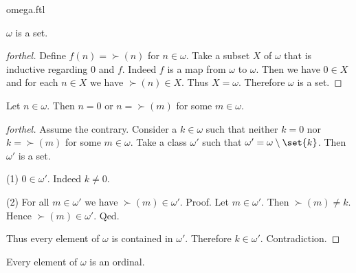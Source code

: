 \documentclass{naproche-library}
\begin{document}
\begin{smodule}[title=Natural Numbers]{omega.ftl}
\begin{corollary}[forthel,id=SET_THEORY_03_4847727433220096]
  $\omega$ is a set.
\end{corollary}
\begin{proof}[forthel]
  Define $f(n) = \succ(n)$ for $n \in \omega$.
  Take a subset $X$ of $\omega$ that is inductive regarding $0$ and $f$.
  Indeed $f$ is a map from $\omega$ to $\omega$.
  Then we have $0 \in X$ and for each $n \in X$ we have $\succ(n) \in X$.
  Thus $X = \omega$.
  Therefore $\omega$ is a set.
\end{proof}

\begin{proposition}[forthel,id=SET_THEORY_03_5885789275684864]
  Let $n \in \omega$.
  Then $n = 0$ or $n = \succ(m)$ for some $m \in \omega$.
\end{proposition}
\begin{proof}[forthel]
  Assume the contrary.
  Consider a $k \in \omega$ such that neither $k = 0$ nor $k = \succ(m)$ for
  some $m \in \omega$.
  Take a class $\omega'$ such that $\omega' = \omega \setminus \set{k}$. %
  Then $\omega'$ is a set.

  (1) $0 \in \omega'$.
  Indeed $k \neq 0$.

  (2) For all $m \in \omega'$ we have $\succ(m) \in \omega'$. \newline
  Proof.
    Let $m \in \omega'$.
    Then $\succ(m) \neq k$.
    Hence $\succ(m) \in \omega'$.
  Qed.

  Thus every element of $\omega$ is contained in $\omega'$.
  Therefore $k \in \omega'$.
  Contradiction.
\end{proof}

\begin{proposition}[forthel,id=SET_THEORY_03_5057540872208384]
  Every element of $\omega$ is an ordinal.
\end{proposition}
\end{smodule}
\end{document}
